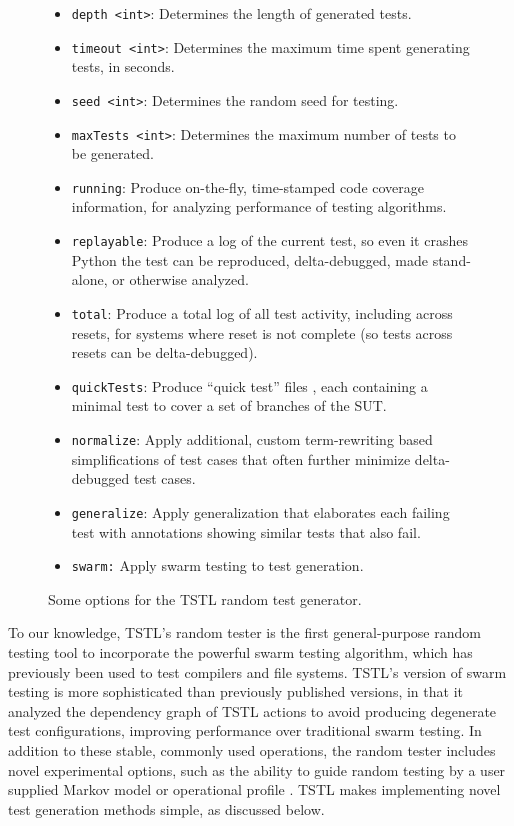 \begin{figure}
{\scriptsize
\begin{itemize}
\item {\tt depth <int>}: Determines the length of generated tests.
\item {\tt timeout <int>}: Determines the maximum time spent generating tests, in seconds.
\item {\tt seed <int>}: Determines the random seed for testing.
\item {\tt maxTests <int>}: Determines the maximum number of tests to be generated.
\item {\tt running}: Produce on-the-fly, time-stamped code coverage information, for analyzing performance of testing algorithms. 
\item {\tt replayable}: Produce a log of the current test, so even it crashes Python the test can be reproduced, delta-debugged, made stand-alone, or otherwise analyzed.
\item {\tt total}: Produce a total log of all test activity, including across resets, for systems where reset is not complete (so tests across resets can be delta-debugged).
\item {\tt quickTests}:  Produce ``quick test'' files \cite{icst14}, each containing a minimal test to cover a set of branches of the SUT. 
\item {\tt normalize}: Apply additional, custom term-rewriting based simplifications of test cases that often further minimize delta-debugged test cases. 
\item {\tt generalize}: Apply generalization that elaborates each failing test with annotations showing similar tests that also fail. 
\item {\tt swarm:}  Apply swarm testing \cite{ISSTA12} to test generation.
\end{itemize}
}
\caption{Some options for the TSTL random test generator.}
\label{tab:rt}
\end{figure}

To our knowledge, TSTL's random tester is the first general-purpose random testing tool to incorporate the powerful swarm testing \cite{ISSTA12} algorithm, which has previously been used to test compilers \cite{ISSTA13,ZhendongPLDI14} and file systems.  TSTL's version of swarm testing is more sophisticated than previously published versions, in that it analyzed the dependency graph of TSTL actions to avoid producing degenerate test configurations, improving performance over traditional swarm testing.  In addition to these stable, commonly used operations, the random tester includes novel experimental options, such as the ability to guide random testing by a user supplied Markov model or operational profile \cite{Hamlet94}.  TSTL makes implementing novel test generation methods simple, as discussed below.

